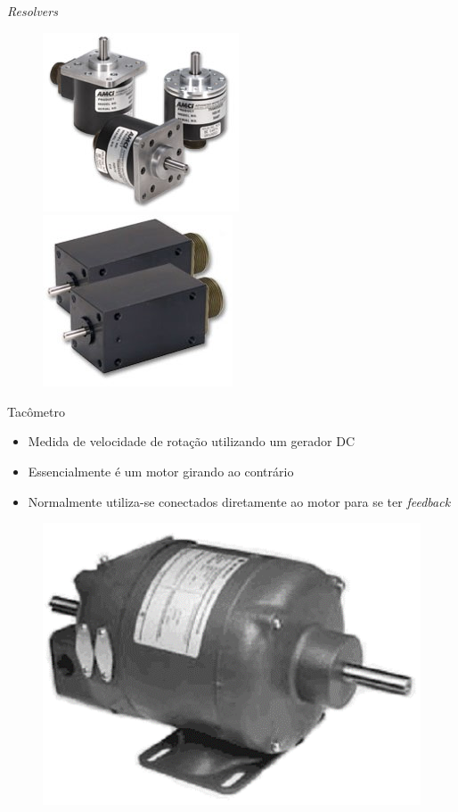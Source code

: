 \documentclass[aspectratio=169,
				xcolor=table]{beamer}
\begin{document}
		\begin{frame}{\textit{Resolvers}}
			\begin{figure}
				\centering
				\includegraphics[scale=.5]{../figs/cap03/Imagem42}	
				\hspace{0.5cm}
				\includegraphics[scale=.5]{../figs/cap03/Imagem43}		
			\end{figure}			
		\end{frame}
		
		\begin{frame}{Tacômetro}
			\begin{itemize}
				\item Medida de velocidade de rotação utilizando um gerador DC
				\item Essencialmente é um motor girando ao contrário
				\item Normalmente utiliza-se conectados diretamente ao motor para se ter \textit{feedback}
			\end{itemize}
			\begin{figure}
				\centering
				\includegraphics[scale=.4]{../figs/cap03/Imagem44}			
			\end{figure}	
		\end{frame}
		\begin{frame}{}
		\end{frame}
\end{document}
